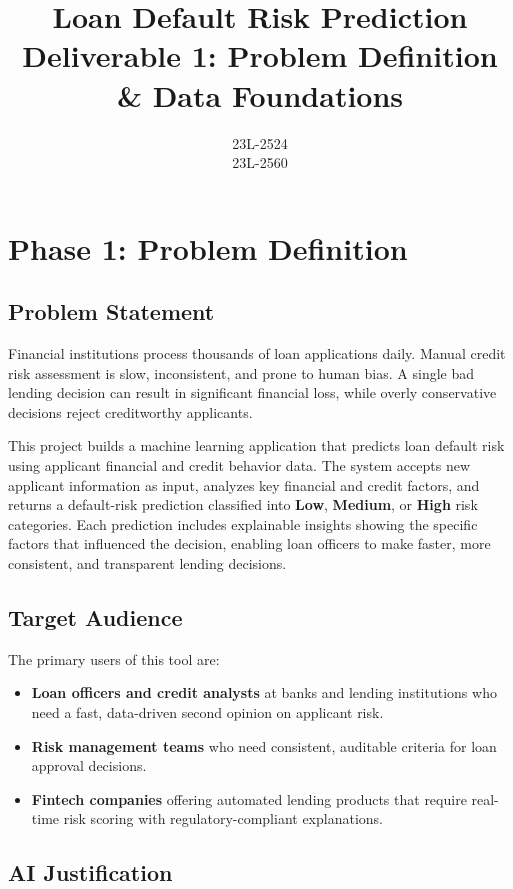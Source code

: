 \documentclass[12pt, a4paper]{article}
\title{\textbf{Loan Default Risk Prediction} \\ \large Deliverable 1: Problem Definition \& Data Foundations}
\author{23L-2524 \\ 23L-2560}
\date{\vspace{-2em}}
\begin{document}
\maketitle
\tableofcontents
\newpage


\section{Phase 1: Problem Definition}

\subsection{Problem Statement}

Financial institutions process thousands of loan applications daily. Manual credit risk assessment is slow, inconsistent, and prone to human bias. A single bad lending decision can result in significant financial loss, while overly conservative decisions reject creditworthy applicants.

This project builds a machine learning application that predicts loan default risk using applicant financial and credit behavior data. The system accepts new applicant information as input, analyzes key financial and credit factors, and returns a default-risk prediction classified into \textbf{Low}, \textbf{Medium}, or \textbf{High} risk categories. Each prediction includes explainable insights showing the specific factors that influenced the decision, enabling loan officers to make faster, more consistent, and transparent lending decisions.

\subsection{Target Audience}

The primary users of this tool are:
\begin{itemize}[noitemsep]
    \item \textbf{Loan officers and credit analysts} at banks and lending institutions who need a fast, data-driven second opinion on applicant risk.
    \item \textbf{Risk management teams} who need consistent, auditable criteria for loan approval decisions.
    \item \textbf{Fintech companies} offering automated lending products that require real-time risk scoring with regulatory-compliant explanations.
\end{itemize}

\subsection{AI Justification}
\end{document}
